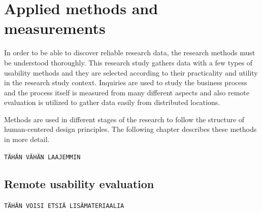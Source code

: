 \documentclass[12pt,a4paper,oneside,pdftex]{report}
\begin{document}

% 

\chapter{Applied methods and measurements}
\label{chapter:methods}
In order to be able to discover reliable research data, the research methods must be understood thoroughly. This research study gathers data with a few types of usability methods and they are selected according to their practicality and utility in the research study context. Inquiries are used to study the business process and the process itself is measured from many different aspects and also remote evaluation is utilized to gather data easily from distributed locations. 

Methods are used in different stages of the research to follow the structure of human-centered design principles. The following chapter describes these methods in more detail.  

\texttt{TÄHÄN VÄHÄN LAAJEMMIN}

\section{Remote usability evaluation}
\label{sec:rue}

\texttt{TÄHÄN VOISI ETSIÄ LISÄMATERIAALIA}
\end{document}
